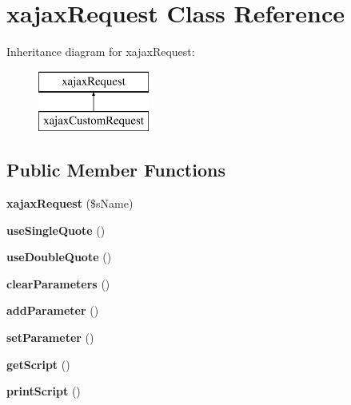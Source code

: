 \hypertarget{classxajaxRequest}{
\section{xajaxRequest Class Reference}
\label{classxajaxRequest}
}
Inheritance diagram for xajaxRequest:\begin{figure}[H]
\begin{center}
\leavevmode
\includegraphics[height=2.000000cm]{classxajaxRequest}
\end{center}
\end{figure}
\subsection*{Public Member Functions}
\begin{DoxyCompactItemize}
\item 
\hypertarget{classxajaxRequest_ad57f6055bdc72e6b658a700f1f7f62fa}{
{\bfseries xajaxRequest} (\$sName)}
\label{classxajaxRequest_ad57f6055bdc72e6b658a700f1f7f62fa}

\item 
\hypertarget{classxajaxRequest_a882cb375bf36f54b93bd713721594aa1}{
{\bfseries useSingleQuote} ()}
\label{classxajaxRequest_a882cb375bf36f54b93bd713721594aa1}

\item 
\hypertarget{classxajaxRequest_a9cd13be104441fe84b95ec760a4d49a6}{
{\bfseries useDoubleQuote} ()}
\label{classxajaxRequest_a9cd13be104441fe84b95ec760a4d49a6}

\item 
\hypertarget{classxajaxRequest_a3fbe22148e730e64d8c1ba293226ff22}{
{\bfseries clearParameters} ()}
\label{classxajaxRequest_a3fbe22148e730e64d8c1ba293226ff22}

\item 
\hypertarget{classxajaxRequest_af9ffb23c244908e442a8bf1408eb7ceb}{
{\bfseries addParameter} ()}
\label{classxajaxRequest_af9ffb23c244908e442a8bf1408eb7ceb}

\item 
\hypertarget{classxajaxRequest_a0f5b09037d1ca4cd6e7894984ec645dc}{
{\bfseries setParameter} ()}
\label{classxajaxRequest_a0f5b09037d1ca4cd6e7894984ec645dc}

\item 
\hypertarget{classxajaxRequest_aacef36822cd51e64ff5313b9861e508d}{
{\bfseries getScript} ()}
\label{classxajaxRequest_aacef36822cd51e64ff5313b9861e508d}

\item 
\hypertarget{classxajaxRequest_a9d1dca5197adadca0edb6ef5ea3b6f15}{
{\bfseries printScript} ()}
\label{classxajaxRequest_a9d1dca5197adadca0edb6ef5ea3b6f15}

\end{DoxyCompactItemize}
